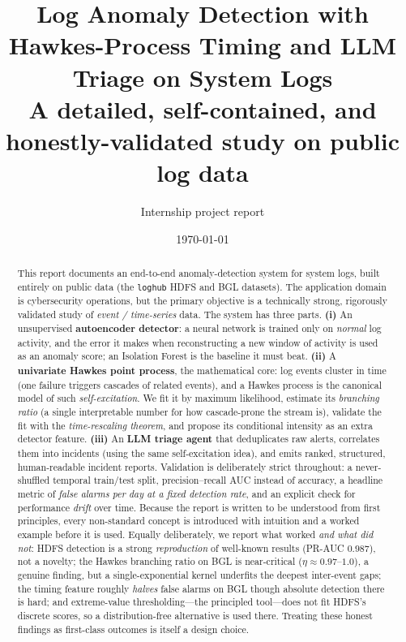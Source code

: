 \documentclass[11pt,a4paper]{article}
\title{\vspace{-1.3cm}\textbf{\LARGE Log Anomaly Detection with Hawkes-Process
Timing and LLM Triage on System Logs}\\[6pt]
\large A detailed, self-contained, and honestly-validated study on public log data}
\author{Internship project report}
\date{\today}
\newcommand{\keyword}[1]{\textbf{\color{accent}#1}}
\newcommand{\code}[1]{\texttt{\small #1}}
\begin{document}
\maketitle
\thispagestyle{fancy}

\begin{abstract}
\noindent
This report documents an end-to-end anomaly-detection system for system logs,
built entirely on public data (the \code{loghub} HDFS and BGL datasets). The
application domain is cybersecurity operations, but the primary objective is a
technically strong, rigorously validated study of \emph{event / time-series}
data. The system has three parts. \textbf{(i)} An unsupervised
\keyword{autoencoder detector}: a neural network is trained only on
\emph{normal} log activity, and the error it makes when reconstructing a new
window of activity is used as an anomaly score; an Isolation Forest is the
baseline it must beat. \textbf{(ii)} A \keyword{univariate Hawkes point
process}, the mathematical core: log events cluster in time (one failure
triggers cascades of related events), and a Hawkes process is the canonical
model of such \emph{self-excitation}. We fit it by maximum likelihood, estimate
its \emph{branching ratio} (a single interpretable number for how cascade-prone
the stream is), validate the fit with the \emph{time-rescaling theorem}, and
propose its conditional intensity as an extra detector feature. \textbf{(iii)}
An \keyword{LLM triage agent} that deduplicates raw alerts, correlates them into
incidents (using the same self-excitation idea), and emits ranked, structured,
human-readable incident reports. Validation is deliberately strict throughout:
a never-shuffled temporal train/test split, precision--recall AUC instead of
accuracy, a headline metric of \emph{false alarms per day at a fixed detection
rate}, and an explicit check for performance \emph{drift} over time. Because the
report is written to be understood from first principles, every non-standard
concept is introduced with intuition and a worked example before it is used.
Equally deliberately, we report what worked \emph{and what did not}: HDFS
detection is a strong \emph{reproduction} of well-known results (PR-AUC
$0.987$), not a novelty; the Hawkes branching ratio on BGL is near-critical
($\eta\approx0.97$--$1.0$), a genuine finding, but a single-exponential kernel
underfits the deepest inter-event gaps; the timing feature roughly
\emph{halves} false alarms on BGL though absolute detection there is hard; and
extreme-value thresholding---the principled tool---does not fit HDFS's discrete
scores, so a distribution-free alternative is used there. Treating these honest
findings as first-class outcomes is itself a design choice.
\end{abstract}
\end{document}
